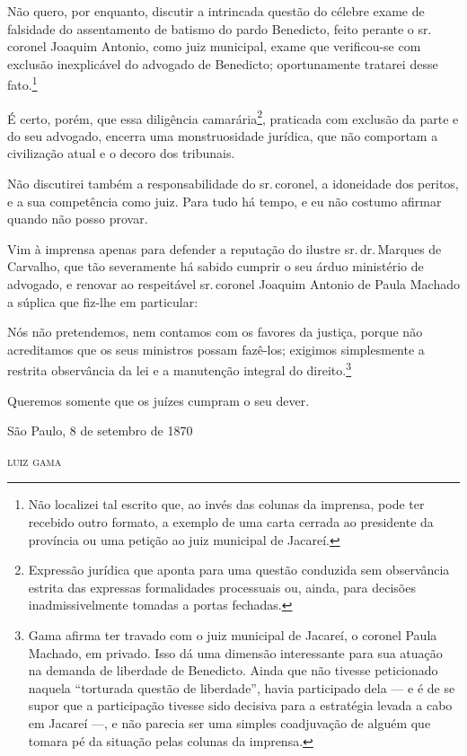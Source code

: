 Não quero, por enquanto, discutir a intrincada questão do célebre exame
de falsidade do assentamento de batismo do pardo Benedicto, feito
perante o sr.\,coronel Joaquim Antonio, como juiz municipal, exame que
verificou-se com exclusão inexplicável do advogado de Benedicto;
oportunamente tratarei desse fato.\footnote{ Não localizei tal escrito
  que, ao invés das colunas da imprensa, pode ter recebido outro
  formato, a exemplo de uma carta cerrada ao presidente da província ou
  uma petição ao juiz municipal de Jacareí.}

É certo, porém, que essa diligência camarária\footnote{ Expressão
  jurídica que aponta para uma questão conduzida sem observância estrita
  das expressas formalidades processuais ou, ainda, para decisões
  inadmissivelmente tomadas a portas fechadas.}, praticada com exclusão
da parte e do seu advogado, encerra uma monstruosidade jurídica, que não
comportam a civilização atual e o decoro dos tribunais.

Não discutirei também a responsabilidade do sr.\,coronel, a idoneidade
dos peritos, e a sua competência como juiz. Para tudo há tempo, e eu não
costumo afirmar quando não posso provar.

Vim à imprensa apenas para defender a reputação do ilustre sr.\,dr.\,Marques de Carvalho, que tão severamente há sabido cumprir o seu árduo
ministério de advogado, e renovar ao respeitável sr.\,coronel Joaquim
Antonio de Paula Machado a súplica que fiz-lhe em particular:

Nós não pretendemos, nem contamos com os favores da justiça, porque não
acreditamos que os seus ministros possam fazê-los; exigimos simplesmente
a restrita observância da lei e a manutenção integral do
direito.\footnote{ Gama afirma ter travado com o juiz municipal de
  Jacareí, o coronel Paula Machado, em privado. Isso dá uma dimensão
  interessante para sua atuação na demanda de liberdade de Benedicto.
  Ainda que não tivesse peticionado naquela ``torturada questão de
  liberdade'', havia participado dela --- e é de se supor que a
  participação tivesse sido decisiva para a estratégia levada a cabo em
  Jacareí ---, e não parecia ser uma simples coadjuvação de alguém que
  tomara pé da situação pelas colunas da imprensa.}

Queremos somente que os juízes cumpram o seu dever.

\begin{flushright}
São Paulo, 8 de setembro de 1870

\textsc{luiz gama}
\end{flushright}

